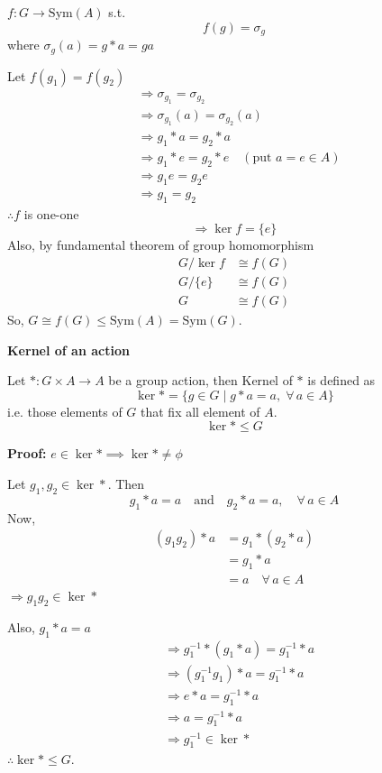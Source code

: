 \documentclass[11pt]{article}
\begin{document}
$f : G \to \text{Sym}(A)$ s.t.
\[
f(g) = \sigma_g
\]
where $\sigma_g(a) = g * a = ga$

\noindent Let $f(g_1) = f(g_2)$
\begin{align*}
&\Rightarrow \sigma_{g_1} = \sigma_{g_2} \\
&\Rightarrow \sigma_{g_1}(a) = \sigma_{g_2}(a) \\
&\Rightarrow g_1 * a = g_2 * a \\
&\Rightarrow g_1 * e = g_2 * e \quad (\text{put } a = e \in A) \\
&\Rightarrow g_1 e = g_2 e \\
&\Rightarrow g_1 = g_2
\end{align*}
$\therefore f$ is one-one
\[
\Rightarrow \ker f = \{e\}
\]
Also, by fundamental theorem of group homomorphism
\begin{align*}
G/\ker f &\cong f(G) \\
G/\{e\} &\cong f(G) \\
G &\cong f(G)
\end{align*}
So, $G \cong f(G) \le \text{Sym}(A) = \text{Sym}(G)$.

\bigskip
\noindent \textbf{Kernel of an action}

\noindent Let $* : G \times A \to A$ be a group action, then Kernel of $*$ is defined as
\[
\ker * = \{g \in G \mid g * a = a, \; \forall\, a \in A\}
\]
i.e. those elements of $G$ that fix all element of $A$.
\[
\ker * \le G
\]

\newpage
\noindent \textbf{Proof:} $e \in \ker * \implies \ker * \ne \phi$

\noindent Let $g_1, g_2 \in \ker *$. Then
\[
g_1 * a = a \quad \text{and} \quad g_2 * a = a, \quad \forall\, a \in A
\]
Now,
\begin{align*}
(g_1 g_2) * a &= g_1 * (g_2 * a) \\
&= g_1 * a \\
&= a \quad \forall\, a \in A
\end{align*}
$\Rightarrow g_1 g_2 \in \ker *$

\noindent Also, $g_1 * a = a$
\begin{align*}
&\Rightarrow g_1^{-1} * (g_1 * a) = g_1^{-1} * a \\
&\Rightarrow (g_1^{-1} g_1) * a = g_1^{-1} * a \\
&\Rightarrow e * a = g_1^{-1} * a \\
&\Rightarrow a = g_1^{-1} * a \\
&\Rightarrow g_1^{-1} \in \ker *
\end{align*}
$\therefore \ker * \le G$.
\end{document}
